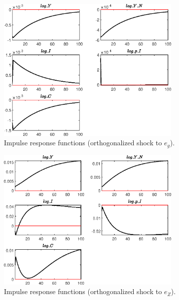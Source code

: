  
\begin{figure}[H]
\centering 
\includegraphics[width=0.80\textwidth]{BRS_growth/graphs/BRS_growth_IRF_e_g}
\caption{Impulse response functions (orthogonalized shock to ${e_g}$).}
\label{Fig:IRF:e_g}
\end{figure}
 
\begin{figure}[H]
\centering 
\includegraphics[width=0.80\textwidth]{BRS_growth/graphs/BRS_growth_IRF_e_Z}
\caption{Impulse response functions (orthogonalized shock to ${e_Z}$).}
\label{Fig:IRF:e_Z}
\end{figure}
 

